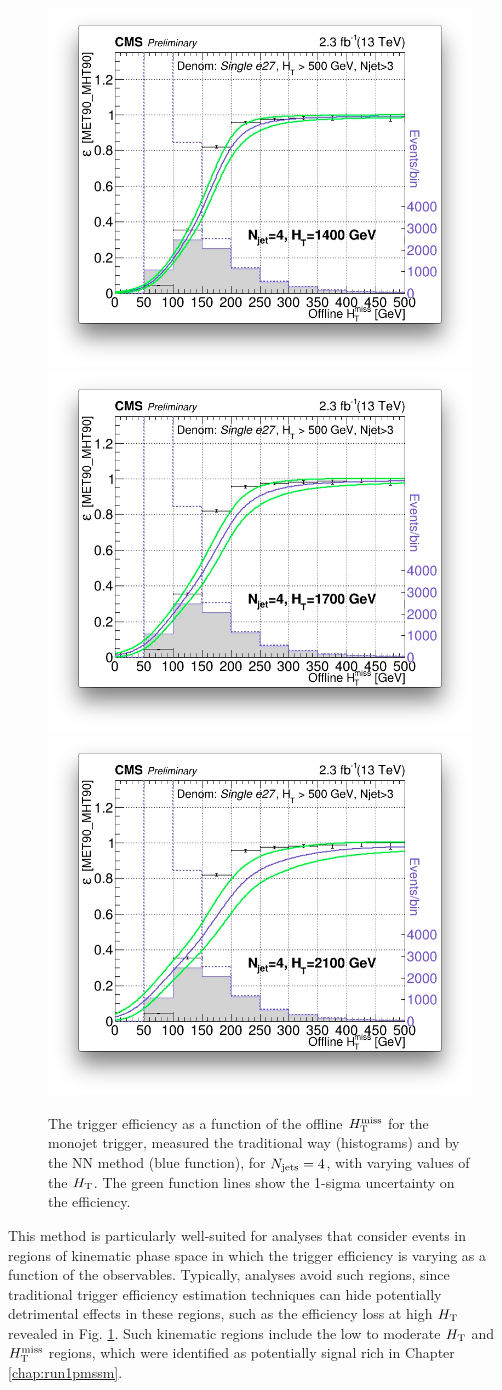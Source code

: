 \begin{figure}[tb!]
\begin{center}
    \includegraphics[width=0.49\linewidth]{figures/trigger/MonoTrigEff_Ht1400.png}\\
        \includegraphics[width=0.49\linewidth]{figures/trigger/MonoTrigEff_Ht1700.png}
    \includegraphics[width=0.49\linewidth]{figures/trigger/MonoTrigEff_Ht2100.png}
    \caption{The trigger efficiency as a function of the offline $H_{\text{T}}^{\rm miss}$ for the monojet trigger, measured the traditional way (histograms) and by the NN method (blue function), for $N_{\rm jets}=4$, with varying values of the $H_{\rm T}$. The green function lines show the 1-sigma uncertainty on the efficiency. }
    \label{fig:mvatrigger}
  \end{center}
\end{figure}
\noindent

This method is particularly well-suited for analyses that consider events in regions of kinematic phase space in which the trigger efficiency is varying as a function of the observables.  Typically, analyses avoid such regions, since traditional trigger efficiency estimation techniques can hide potentially detrimental effects in these regions, such as the efficiency loss at high $H_{\rm T}$ revealed in Fig. \ref{fig:mvatrigger}. Such kinematic regions include the low to moderate $H_{\rm T}$ and $H_{\text{T}}^{\rm miss}$ regions, which were identified as potentially signal rich in Chapter \ref{chap:run1pmssm}.

